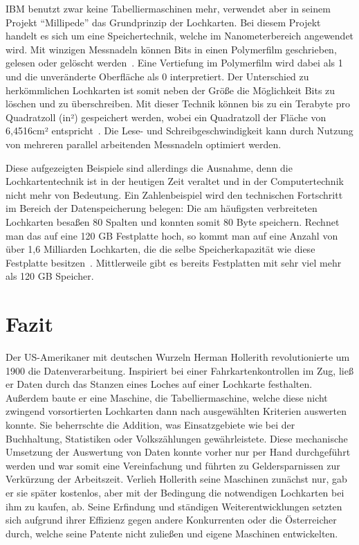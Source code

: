 \documentclass[parskip=half]{scrartcl}
\begin{document}
IBM benutzt zwar keine Tabelliermaschinen mehr, verwendet aber in seinem
Projekt \enquote{Millipede} das Grundprinzip der Lochkarten. Bei diesem Projekt
handelt es sich um eine Speichertechnik, welche im Nanometerbereich angewendet
wird.  Mit winzigen Messnadeln können Bits in einen Polymerfilm geschrieben,
gelesen oder gelöscht werden~\cite{binnig}. Eine Vertiefung im
Polymerfilm wird dabei als 1 und die unveränderte Oberfläche als 0
interpretiert. Der Unterschied zu herkömmlichen Lochkarten ist somit neben der
Größe die Möglichkeit Bits zu löschen und zu überschreiben. Mit dieser Technik
können bis zu ein Terabyte pro Quadratzoll (in²) gespeichert werden, wobei ein
Quadratzoll der Fläche von 6,4516cm² entspricht~\cite{binnig}. Die
Lese- und Schreibgeschwindigkeit kann durch Nutzung von mehreren parallel
arbeitenden Messnadeln optimiert werden.

Diese aufgezeigten Beispiele sind allerdings die Ausnahme, denn die
Lochkartentechnik ist in der heutigen Zeit veraltet und in der Computertechnik
nicht mehr von Bedeutung. Ein Zahlenbeispiel wird den technischen Fortschritt
im Bereich der Datenspeicherung belegen: Die am häufigsten verbreiteten
Lochkarten besaßen 80 Spalten und konnten somit 80 Byte speichern. Rechnet man
das auf eine 120 GB Festplatte hoch, so kommt man auf eine Anzahl von über 1,6
Milliarden Lochkarten, die die selbe Speicherkapazität wie diese Festplatte
besitzen~\cite{roeltgen}. Mittlerweile gibt es bereits Festplatten mit sehr
viel mehr als 120 GB Speicher.

\section{Fazit}

Der US-Amerikaner mit deutschen Wurzeln Herman Hollerith revolutionierte um 1900 die Datenverarbeitung. 
Inspiriert bei einer Fahrkartenkontrollen im Zug, ließ er Daten durch das Stanzen eines Loches auf einer 
Lochkarte festhalten. Außerdem baute er eine Maschine, die Tabelliermaschine, welche diese nicht zwingend vorsortierten Lochkarten dann nach ausgewählten Kriterien auswerten konnte. 
Sie beherrschte die Addition, was Einsatzgebiete wie bei der Buchhaltung, Statistiken oder Volkszählungen gewährleistete. Diese mechanische 
Umsetzung der Auswertung von Daten konnte vorher nur per Hand durchgeführt werden und war somit eine Vereinfachung und führten zu Geldersparnissen zur Verkürzung der Arbeitszeit.
Verlieh Hollerith seine Maschinen zunächst nur, gab er sie später kostenlos, aber mit der Bedingung die notwendigen Lochkarten bei ihm zu kaufen, ab.
Seine Erfindung und ständigen Weiterentwicklungen setzten sich aufgrund ihrer Effizienz gegen andere Konkurrenten 
oder die Österreicher durch, welche seine Patente nicht zuließen und eigene Maschinen entwickelten.
\end{document}
